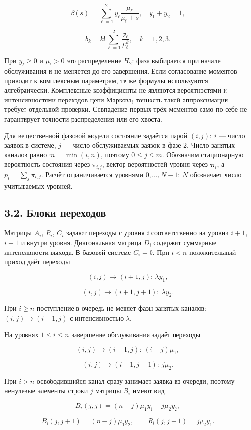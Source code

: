 \[\beta(s)=\sum_{\ell=1}^{2}y_\ell\frac{\mu_\ell}{\mu_\ell+s},\quad
y_1+y_2=1,\]

\[b_k=k!\sum_{\ell=1}^{2}\frac{y_\ell}{\mu_\ell^k},\quad k=1,2,3.\]


При \(y_\ell\ge0\) и \(\mu_\ell>0\) это распределение \(H_2\): фаза выбирается при начале обслуживания и не меняется до его завершения. Если согласование моментов приводит к комплексным параметрам, те же формулы используются алгебраически. Комплексные коэффициенты не являются вероятностями и интенсивностями переходов цепи Маркова; точность такой аппроксимации требует отдельной проверки. Совпадение первых трёх моментов само по себе не гарантирует точности распределения или его хвоста.

Для вещественной фазовой модели состояние задаётся парой \((i,j)\): \(i\) --- число заявок в системе, \(j\) --- число обслуживаемых заявок в фазе 2. Число занятых каналов равно \(m=\min(i,n)\), поэтому \(0\le j\le m.\) Обозначим стационарную вероятность состояния через \(\pi_{i,j}\), вектор вероятностей уровня через \(\boldsymbol\pi_i\), а \(p_i=\sum_j\pi_{i,j}.\) Расчёт ограничивается уровнями \(0,\ldots,N-1\); \(N\) обозначает число учитываемых уровней.

\subsection*{3.2. Блоки переходов}
Матрицы \(A_i\), \(B_i\), \(C_i\) задают переходы с уровня \(i\) соответственно на уровни \(i+1\), \(i-1\) и внутри уровня. Диагональная матрица \(D_i\) содержит суммарные интенсивности выхода. В базовой системе \(C_i=0.\) При \(i<n\) положительный приход даёт переходы


\[(i,j)\to(i+1,j):\ \lambda y_1,\]

\[(i,j)\to(i+1,j+1):\ \lambda y_2.\]


При \(i\ge n\) поступление в очередь не меняет фазы занятых каналов: \((i,j)\to(i+1,j)\) с интенсивностью \(\lambda.\)

На уровнях \(1\le i\le n\) завершение обслуживания задаёт переходы


\[(i,j)\to(i-1,j):\ (i-j)\mu_1,\]

\[(i,j)\to(i-1,j-1):\ j\mu_2.\]


При \(i>n\) освободившийся канал сразу занимает заявка из очереди, поэтому ненулевые элементы строки \(j\) матрицы \(B_i\) имеют вид


\[B_i(j,j)=(n-j)\mu_1y_1+j\mu_2y_2,\]

\[B_i(j,j+1)=(n-j)\mu_1y_2,\qquad
B_i(j,j-1)=j\mu_2y_1.\]


